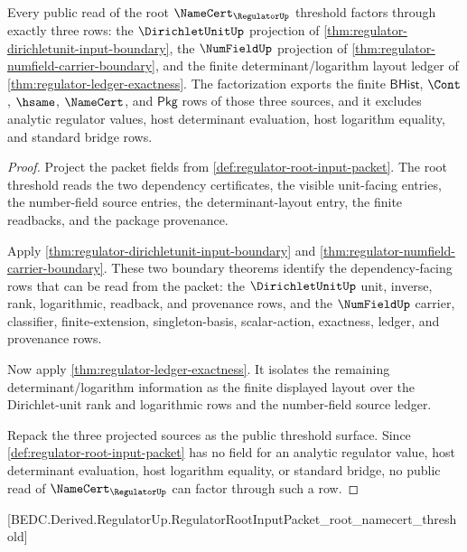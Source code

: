 \begin{theorem}
\label{thm:regulator-dependency-ledger-factorization}
Every public read of the root $\NameCert_{\RegulatorUp}$ threshold factors
through exactly three rows: the $\DirichletUnitUp$ projection of
\autoref{thm:regulator-dirichletunit-input-boundary}, the $\NumFieldUp$
projection of \autoref{thm:regulator-numfield-carrier-boundary}, and the
finite determinant/logarithm layout ledger of
\autoref{thm:regulator-ledger-exactness}. The factorization exports the
finite $\mathsf{BHist}$, $\Cont$, $\hsame$, $\NameCert$, and $\mathsf{Pkg}$
rows of those three sources, and it excludes analytic regulator values, host
determinant evaluation, host logarithm equality, and standard bridge rows.
\end{theorem}
\begin{proof}
Project the packet fields from \autoref{def:regulator-root-input-packet}. The
root threshold reads the two dependency certificates, the visible unit-facing
entries, the number-field source entries, the determinant-layout entry, the
finite readbacks, and the package provenance.

Apply \autoref{thm:regulator-dirichletunit-input-boundary} and
\autoref{thm:regulator-numfield-carrier-boundary}. These two boundary
theorems identify the dependency-facing rows that can be read from the packet:
the $\DirichletUnitUp$ unit, inverse, rank, logarithmic, readback, and
provenance rows, and the $\NumFieldUp$ carrier, classifier,
finite-extension, singleton-basis, scalar-action, exactness, ledger, and
provenance rows.

Now apply \autoref{thm:regulator-ledger-exactness}. It isolates the remaining
determinant/logarithm information as the finite displayed layout over the
Dirichlet-unit rank and logarithmic rows and the number-field source ledger.

Repack the three projected sources as the public threshold surface. Since
\autoref{def:regulator-root-input-packet} has no field for an analytic
regulator value, host determinant evaluation, host logarithm equality, or
standard bridge, no public read of $\NameCert_{\RegulatorUp}$ can factor
through such a row.
\end{proof}

[BEDC.Derived.RegulatorUp.RegulatorRootInputPacket\_root\_namecert\_threshold]


